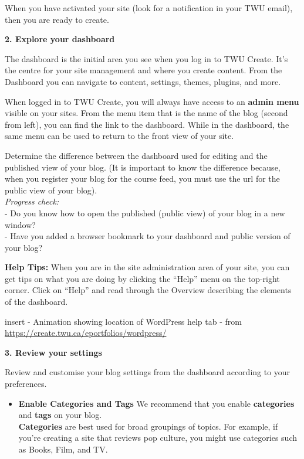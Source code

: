 \documentclass[
]{book}
\providecommand{\tightlist}{%
  \setlength{\itemsep}{0pt}\setlength{\parskip}{0pt}}
\theoremstyle{definition}
\theoremstyle{definition}
\theoremstyle{definition}
\theoremstyle{definition}
\theoremstyle{remark}
\begin{document}
\begin{reflect}
When you have activated your site (look for a notification in your TWU email), then you are ready to create.

\textbf{2. Explore your dashboard}

The dashboard is the initial area you see when you log in to TWU Create. It's the centre for your site management and where you create content. From the Dashboard you can navigate to content, settings, themes, plugins, and more.

When logged in to TWU Create, you will always have access to an \textbf{admin menu} visible on your sites. From the menu item that is the name of the blog (second from left), you can find the link to the dashboard. While in the dashboard, the same menu can be used to return to the front view of your site.

Determine the difference between the dashboard used for editing and the published view of your blog. (It is important to know the difference because, when you register your blog for the course feed, you must use the url for the public view of your blog).\\
\emph{Progress check:}\\
- Do you know how to open the published (public view) of your blog in a new window?\\
- Have you added a browser bookmark to your dashboard and public version of your blog?

\textbf{Help Tips:} When you are in the site administration area of your site, you can get tips on what you are doing by clicking the ``Help'' menu on the top-right corner. Click on ``Help'' and read through the Overview describing the elements of the dashboard.

insert - Animation showing location of WordPress help tab - from \url{https://create.twu.ca/eportfolios/wordpress/}

\textbf{3. Review your settings}

Review and customise your blog settings from the dashboard according to your preferences.

\begin{itemize}
\tightlist
\item
  \textbf{Enable Categories and Tags}
  We recommend that you enable \textbf{categories} and \textbf{tags} on your blog.\\
  \textbf{Categories} are best used for broad groupings of topics. For example, if you're creating a site that reviews pop culture, you might use categories such as Books, Film, and TV.
\end{itemize}


\end{reflect}
\end{document}
